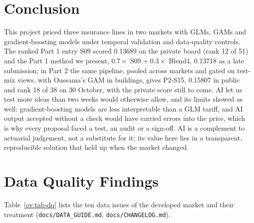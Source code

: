\documentclass{rapport}
\begin{document}
\section{Conclusion}

This project priced three insurance lines in two markets with GLMs, GAMs and gradient-boosting models under temporal
validation and data-quality controls. The ranked Part 1 entry S09 scored 0.13689 on the private board (rank 12 of 51)
and the Part 1 method we present, $0.7\times$ S09 $+\ 0.3\times$ Blend4, 0.13718 as a late submission; in Part 2 the
same pipeline, pooled across markets and gated on test-mix views, with Oussama's GAM in buildings, gives P2-S15,
0.15807 in public and rank 18 of 38 on 30 October, with the private score still to come. AI let us test more ideas than
two weeks would otherwise allow, and its limits showed as well: gradient-boosting models are less interpretable than a
GLM tariff, and AI output accepted without a check would have carried errors into the price, which is why every
proposal faced a test, an audit or a sign-off. AI is a complement to actuarial judgement, not a substitute for it; its
value here lies in a transparent, reproducible solution that held up when the market changed.

\clearpage
\appendix

\section{Data Quality Findings}
\label{ov:app-dq}

Table~\ref{ov:tab-dq} lists the ten data issues of the developed market and their treatment
(\texttt{docs/DATA\_GUIDE.md}, \texttt{docs/CHANGELOG.md}).
\end{document}

